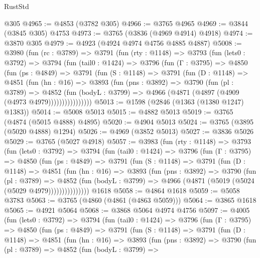 \begin{lexlean}{RustStd}
\begin{coremodule}
    @305
@4965 := @4853 (@3782 @305)
@4966 := @3765 @4965
@4969 := @3844 (@3845 @305) @4753
@4973 := @3765 (@3836 (@4969 @4914) @4918)
@4974 := @3870 @305
@4979 := @4923 (@4924 @4974 @4756 @4885 @4887)
@5008 := @3980
    (fun (rc : @3789) =>
    @3791
      (fun (rty : @1148) =>
      @3793
        (fun (lets0 : @3792) =>
        @3794
          (fun (tail0 : @1424) =>
          @3796
            (fun (Γ : @3795) =>
            @4850
              (fun (ps : @4849) =>
              @3791
                (fun (S : @1148) =>
                @3791
                  (fun (D : @1148) =>
                  @4851
                    (fun (hn : @16) =>
                    @3893
                      (fun (pns : @3892) =>
                      @3790
                        (fun (pl : @3789) =>
                        @4852
                          (fun (bodyL : @3799) =>
                          @4966 (@4871 (@4897 (@4909 (@4973 @4979))))))))))))))))
@5013 := @1598 (@2846 (@1363 (@1380 @1247) @1383))
@5014 := @5008 @5013
@5015 := @4882 @5013
@5019 := @3765 (@4874 (@5015 @4888) @4895)
@5020 := @4904 @5013
@5024 := @3765 (@3895 (@5020 @4888) @1294)
@5026 := @4969 (@3852 @5013)
@5027 := @3836 @5026
@5029 := @3765 (@5027 @4918)
@5057 := @3983
    (fun (rty : @1148) =>
    @3793
      (fun (lets0 : @3792) =>
      @3794
        (fun (tail0 : @1424) =>
        @3796
          (fun (Γ : @3795) =>
          @4850
            (fun (ps : @4849) =>
            @3791
              (fun (S : @1148) =>
              @3791
                (fun (D : @1148) =>
                @4851
                  (fun (hn : @16) =>
                  @3893
                    (fun (pns : @3892) =>
                    @3790
                      (fun (pl : @3789) =>
                      @4852
                        (fun (bodyL : @3799) =>
                        @4966 (@4871 (@5019 (@5024 (@5029 @4979)))))))))))))))
    @1618
@5058 := @4864 @1618
@5059 := @5058 @3783
@5063 := @3765 (@4860 (@4861 (@4863 @5059)))
@5064 := @3865 @1618
@5065 := @4921 @5064
@5068 := @3868 @5064 @4974 @4756
@5097 := @4005
    (fun (lets0 : @3792) =>
    @3794
      (fun (tail0 : @1424) =>
      @3796
        (fun (Γ : @3795) =>
        @4850
          (fun (ps : @4849) =>
          @3791
            (fun (S : @1148) =>
            @3791
              (fun (D : @1148) =>
              @4851
                (fun (hn : @16) =>
                @3893
                  (fun (pns : @3892) =>
                  @3790
                    (fun (pl : @3789) =>
                    @4852
                      (fun (bodyL : @3799) =>

\end{coremodule}
\end{lexlean}
